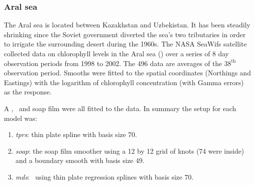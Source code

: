 \subsubsection{Aral sea}
\label{aral-sec}

The Aral sea is located between Kazakhstan and Uzbekistan. It has been steadily shrinking since the Soviet government diverted the sea's two tributaries in order to irrigate the surrounding desert during the 1960s. The NASA SeaWifs satellite collected data on chlorophyll levels in the Aral sea (\cite{soap}) over a series of 8 day observation periods from 1998 to 2002. The 496 data are averages of the $38^\text{th}$ observation period. Smooths were fitted to the spatial coordinates (Northings and Eastings) with the logarithm of chlorophyll concentration (with Gamma errors) as the response.

A \tprs, \mdsap\ and soap film were all fitted to the data. In summary the setup for each model was:
\begin{enumerate}
\item \emph{tprs}: thin plate spline with basis size 70.
\item \emph{soap}: the soap film smoother using a 12 by 12 grid of knots (74 were inside) and a boundary smooth with basis size 49.
\item \emph{mds}: \mdsap\ using thin plate regression splines with basis size 70.
\end{enumerate}

